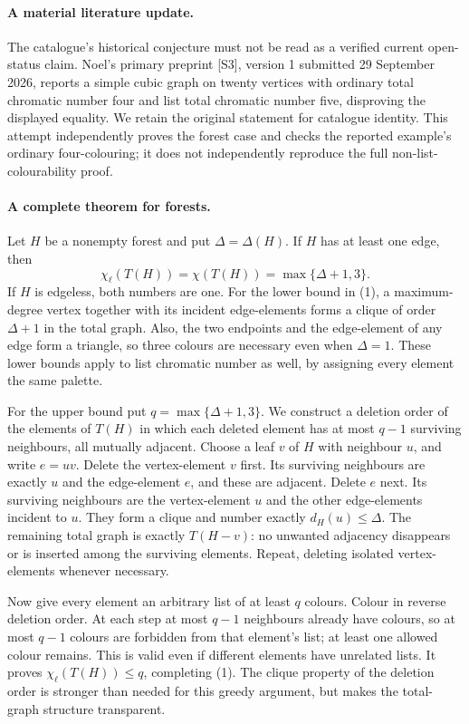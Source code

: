 \documentclass[11pt,a4paper]{article}
\begin{document}
\paragraph{A material literature update.}
The catalogue's historical conjecture must not be read as a verified current open-status claim. Noel's primary preprint [S3], version 1 submitted 29 September 2026, reports a simple cubic graph on twenty vertices with ordinary total chromatic number four and list total chromatic number five, disproving the displayed equality. We retain the original statement for catalogue identity. This attempt independently proves the forest case and checks the reported example's ordinary four-colouring; it does not independently reproduce the full non-list-colourability proof.

\paragraph{A complete theorem for forests.}
Let $H$ be a nonempty forest and put $\Delta=\Delta(H)$. If $H$ has at least one edge, then
\[
 \chi_\ell(T(H))=\chi(T(H))=\max\{\Delta+1,3\}. \tag{1}
\]
If $H$ is edgeless, both numbers are one. For the lower bound in (1), a maximum-degree vertex together with its incident edge-elements forms a clique of order $\Delta+1$ in the total graph. Also, the two endpoints and the edge-element of any edge form a triangle, so three colours are necessary even when $\Delta=1$. These lower bounds apply to list chromatic number as well, by assigning every element the same palette.

For the upper bound put $q=\max\{\Delta+1,3\}$. We construct a deletion order of the elements of $T(H)$ in which each deleted element has at most $q-1$ surviving neighbours, all mutually adjacent. Choose a leaf $v$ of $H$ with neighbour $u$, and write $e=uv$. Delete the vertex-element $v$ first. Its surviving neighbours are exactly $u$ and the edge-element $e$, and these are adjacent. Delete $e$ next. Its surviving neighbours are the vertex-element $u$ and the other edge-elements incident to $u$. They form a clique and number exactly $d_H(u)\le\Delta$. The remaining total graph is exactly $T(H-v)$: no unwanted adjacency disappears or is inserted among the surviving elements. Repeat, deleting isolated vertex-elements whenever necessary.

Now give every element an arbitrary list of at least $q$ colours. Colour in reverse deletion order. At each step at most $q-1$ neighbours already have colours, so at most $q-1$ colours are forbidden from that element's list; at least one allowed colour remains. This is valid even if different elements have unrelated lists. It proves $\chi_\ell(T(H))\le q$, completing (1). The clique property of the deletion order is stronger than needed for this greedy argument, but makes the total-graph structure transparent.
\end{document}
